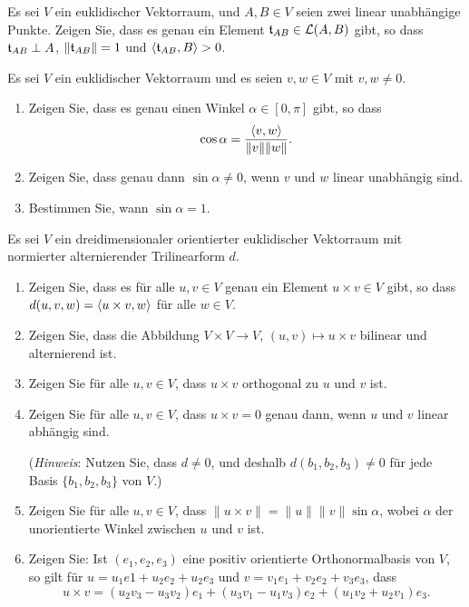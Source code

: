 \begin{question}
  Es sei $V$ ein euklidischer Vektorraum, und $A, B \in V$ seien zwei linear unabhängige Punkte.
  Zeigen Sie, dass es genau ein Element $\mathfrak{t}_{AB} \in \operatorname{\mathcal{L}}(A,B)$ gibt, so dass $\mathfrak{t}_{AB} \perp A$, $\|\mathfrak{t}_{AB}\| = 1$ und $\left\langle \mathfrak{t}_{AB}, B \right\rangle > 0$.
\end{question}


\begin{question}
  Es sei $V$ ein euklidischer Vektorraum und es seien $v, w \in V$ mit $v, w \neq 0$.
  \begin{enumerate}[leftmargin=*]
    \item
      Zeigen Sie, dass es genau einen Winkel $\alpha \in [0,\pi]$ gibt, so dass
      \[
          \cos \alpha
        = \frac{\left\langle v, w \right\rangle}{\|v\| \|w\|}.
      \]
    \item
      Zeigen Sie, dass genau dann $\sin \alpha \neq 0$, wenn $v$ und $w$ linear unabhängig sind.
    \item
      Bestimmen Sie, wann $\sin \alpha = 1$.
  \end{enumerate}
\end{question}


\begin{question}
  Es sei $V$ ein dreidimensionaler orientierter euklidischer Vektorraum mit normierter alternierender Trilinearform $d$.
  \begin{enumerate}[leftmargin=*]
    \item
      Zeigen Sie, dass es für alle $u, v \in V$ genau ein Element $u \times v \in V$ gibt, so dass $d(u,v,w) = \left\langle u \times v, w \right\rangle$ für alle $w \in V$.
    \item
      Zeigen Sie, dass die Abbildung $V \times V \to V$, $(u,v) \mapsto u \times v$ bilinear und alternierend ist.
    \item
      Zeigen Sie für alle $u, v \in V$, dass $u \times v$ orthogonal zu $u$ und $v$ ist.
    \item
      Zeigen Sie für alle $u, v \in V$, dass $u \times v = 0$ genau dann, wenn $u$ und $v$ linear abhängig sind.
      
      (\emph{Hinweis}:
       Nutzen Sie, dass $d \neq 0$, und deshalb $d(b_1, b_2, b_3) \neq 0$ für jede Basis $\{b_1, b_2, b_3\}$ von $V$.)
    \item
      Zeigen Sie für alle $u, v \in V$, dass $\|u \times v\| = \|u\| \|v\| \sin \alpha$, wobei $\alpha$ der unorientierte Winkel zwischen $u$ und $v$ ist.
    \item
      Zeigen Sie:
      Ist $(e_1, e_2, e_3)$ eine positiv orientierte Orthonormalbasis von $V$, so gilt für $u = u_1 e1 + u_2 e_2 + u_2 e_3$ und $v = v_1 e_1 + v_2 e_2 + v_3 e_3$, dass
      \[
        u \times v = (u_2 v_3 - u_3 v_2) e_1 + (u_3 v_1 - u_1 v_3) e_2 + (u_1 v_2 + u_2 v_1) e_3.
      \]
  \end{enumerate}
\end{question}

